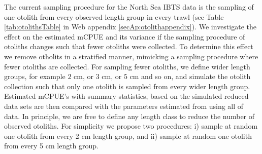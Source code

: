 \documentclass[a4paper 12pt]{article}
\numberwithin{equation}{section}
\begin{document}
The current sampling procedure for the North Sea IBTS data is the sampling of one otolith from every observed length group in every trawl (see Table \ref{tab:otolithsTable} in Web appendix \ref{secAp:otolithappendix}). We investigate the effect on the estimated mCPUE and its variance if the sampling procedure of otoliths changes such that fewer otoliths were collected. To determine this effect we remove otholits in a stratified manner, mimicking a sampling procedure where fewer otoliths are collected. For sampling fewer otoliths, we define wider length groups, for example $2$ cm, or $3$ cm, or $5$ cm and so on,  and simulate the otolith  collection such that only one otolith is sampled from every wider length group. Estimated mCPUE's with summary statistics, based on the simulated reduced data sets are then compared with the parameters estimated from using all of data. In principle, we are free to define any length class to reduce the number of observed otoliths. For simplicity we propose two procedures: i) sample at random  one otolith from every 2 cm length group, and ii) sample at random one otolith from every 5 cm length group. 

%

\end{document}
